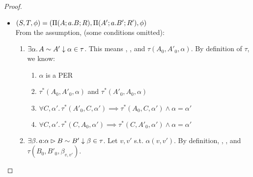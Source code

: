 \begin{proof}
\begin{enumerate}
\begin{itemize}
\begin{itemize}
\begin{itemize}
            Fact~\ref{fact:peq} and~\ref{fact:peq1}.
          \item {}. By applying 
            Lemma~\ref{omega:per} with Fact~\ref{fact:qeq} and~\ref{fact:qeq1}.
          \item $\phi' = \{(\thunk{M}, \thunk{M'}) \mid \\
  \sameComp{}{M}{M'}{\alpha'}\\
  \land \evalCost{M}{c}{v}, \evalCost{M'}{c'}{v'}, \eval{P}{\bar{p}},  
    \eval{P''}{\bar{p''}}, \eval{[v/a]Q}{\bar{q}}, \eval{[v'/a]Q''}{\bar{q''}}\\
  \land p \ge c + q \land p'' \ge c' + q''\\
            \}$.
            First,  since $\alpha' = \alpha^*$ and 
            by Fact~\ref{fact:phiprime}. Next, NTS
            \[
              p' \ge c + q' \land p'' \ge c' + q'' \iff
              p \ge c + q \land p'' \ge c' + q''
            \]
            This is true since $p = p'$ by Lemma~\ref{omega:values} and 
            $q = q'$ by Lemma~\ref{omega:values}.
        \end{itemize}
    \end{itemize}
\item $(S,T,\phi) =(\Pi(A; a.B; R), \Pi(A'; a.B'; R'), \phi)$\\
    From the assumption,  (some conditions omitted): 
  \begin{enumerate}
  \item $\exists \alpha.\, A \sim A' \downarrow \alpha \in \tau$. This means 
  , , and $\tau(A_0,A'_0,\alpha)$. By definition of $\tau$, we know: 
  \begin{enumerate}[label=\textbf{A.\arabic*}]
    \item $\alpha$ is a PER
    \item $\tau^*(A_0,A'_0,\alpha)$ and $\tau^*(A'_0,A_0,\alpha)$ 
    \item $\forall C,\alpha'.\, \tau^*(A'_0,C,\alpha') \implies \tau^*(A_0,C,\alpha') \land \alpha = \alpha'$ \label{fact:1}
    \item $\forall C,\alpha'.\, \tau^*(C,A_0,\alpha') \implies \tau^*(C,A'_0,\alpha') \land \alpha = \alpha'$
   \end{enumerate}
 \item $\exists \beta.\, a {:} \alpha \rhd B \sim B' \downarrow \beta \in \tau$. \label{fact:10}
  Let $v,v'$ s.t. $\alpha(v,v')$.
  By definition, , , and $\tau(B_0,B'_0,\beta_{v,v'})$.

\end{enumerate}
\end{itemize}
\end{enumerate}
\end{proof}
